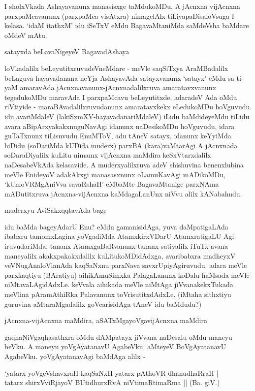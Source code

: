 I sholxVkada Ashayavanunx manasisxge taMdukoMDu, A jAcnxna vijAcnxna parxpaMcavanunx (parxpaMca-visAtxra) nimagelAlx tiLiyapaDisaloVsuga I kelasa. `idaM itathxM' idu iSeTxV eMdu BagavaMtaniMda saMdeVsha baMdare oMdeV mAtu.

satayxda beLavaNigeyeV BagavadAshaya

loVkadalilx beLeyutitxruvudeVneMdare - meVle saqSiTxya AraMBadalilx beLaguva hayavadanana neYja AshayavAda satayxvanunx `satayx' eMdu sa-ti-yaM amaravAda jAcnxnavanunx-jAcnxnadalilxruva amaratavxvanunx tegedukoMDu maravAda I parxpaMcavu beLeyutitxde. adaradeV Ada oMdu riVtiyide - maraBAvadalilxruvudanunx amaratavxkekx eLedukoMDu hoVguvudu. idu avariMdaleV (lakiSxmXV-hayavadanariMdaleV) iLidu baMdideyeMdu tiLidu avara aBipArxyakakxnuguNavAgi idanunx naDesikoMDu hoVguvudu, idara guTaTxnunx tiLisuvudu EnuMToV, adu tAneV satayx. idanunx keYyiMda hiDidu (soDariMda kUDida muderx) parxBA (kara)vaMtarAgi A jAcnxnada soDaraDiyalilx kuLitu nimamx vijAcnxna maMdira keSxVtarxdalilx naDesabeVkAda kelasavide. A muderxyalilxruva adeV shishuvina benenxlubina meVle EnideyoV adakAkxgi manasasxnunx oLamuKavAgi mADikoMDu, `kUmoVRMgAniVva savaRshaH' eMbaMte BagavaMtanige parxNAma mADutitxruva jAcnxna-vijAcnxna kaMdagaLanUnx niVvu alilx kANabahudu.

muderxyu AviSakxqqtavAda bage

idu baMda bageyAdarU Enu? eMdu gamanisidAga, yuva daMpatigaLAda ibabxru tamomxLagina yoVgadiMda AtamxkirxVDarU AtamxratigaLU Agi iruvudariMda, tananx AtamxgaBaRvanunx tananx satiyalilx iTuTx avana maneyalilx akakxpakakxdalilx kuLitukoMDidAdxga, avaribabxra madheyxV veVNugAnaloVlanAda kaqSaNxnu parxNava savxrUpiyAgiruvudu. adara meVle parxkaqtiyu (BAratiyu) aihikAmuSimxka PalagaLanunx koDalu haMsada meVle niMtavaLAgidAdxLe. keVvala aihikada meVle niMtAga jiVvanakekxTukada meVlina pAramAthiRka Palavanunx toVrisutitxdAdxLe. (iMtaha sithxtiyu guruvina aMtaraMgadalilx goVcarisidAga tAneV idu baMdudu?)

jAcnxna-vijAcnxna maMdira, aSATxMgayoVgavijAcnxna maMdira

gaqhaNiVgaqhasathxra oMdu dAMpatayx jiVvana naDesalu oMdu maneyu beVku. A maneyu yoVgAyatanavU AgabeVku. aMteyeV BoVgAyatanavU AgabeVku. yoVgAyatanavAgi baMdAga alilx -

\begin{shloka}
`yatarx yoVgeVshavxraH kaqSaNxH yatarx pAthoVR dhanudhaRraH |\\
tatarx shirxVviRjayoV BUtidhurxRvA niVtimaRtimaRma || (Ba. giV.)
\end{shloka}


